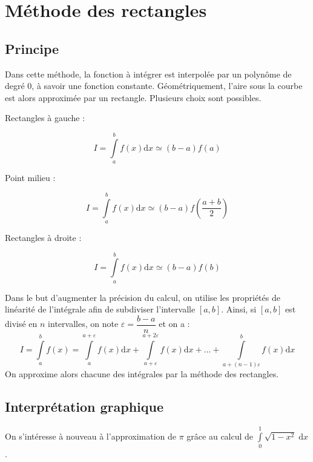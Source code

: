 \documentclass[10pt,fleqn]{article} %
\begin{document}
\section{Méthode des rectangles}
\subsection{Principe}
\begin{defi}
Dans cette méthode, la fonction à intégrer est interpolée par un polynôme de degré 0, à savoir une fonction constante. Géométriquement, l'aire sous la courbe est alors approximée par un rectangle. Plusieurs choix sont possibles.

\begin{minipage}[c]{.3\linewidth}
Rectangles à gauche :

$$
I = \int\limits_a^{b} f(x) \mathrm{d}x \simeq \left(b-a\right) f(a) 
$$
\end{minipage}\hfill
\begin{minipage}[c]{.3\linewidth}
Point milieu :

$$
I = \int\limits_a^{b} f(x) \mathrm{d}x \simeq \left(b-a\right) f\left(\dfrac{a+b}{2}\right) 
$$
\end{minipage}\hfill
\begin{minipage}[c]{.3\linewidth}
Rectangles à droite :

$$
I = \int\limits_a^{b} f(x) \mathrm{d}x \simeq \left(b-a\right) f(b) 
$$
\end{minipage}

\end{defi}

\begin{rem}
Dans le but d'augmenter la précision du calcul, on utilise les propriétés de linéarité de l'intégrale afin de subdiviser l'intervalle $[a,b]$. Ainsi, si $[a,b]$ est divisé en $n$ intervalles, on note $\varepsilon=\dfrac{b-a}{n}$ et on a :  
$$
I= \int\limits_a^{b} f(x) = \int\limits_{a}^{a+\varepsilon} f(x) \mathrm{d}x + \int\limits_{a+\varepsilon}^{a+2\varepsilon} f(x) \mathrm{d}x + ... + \int\limits_{a+(n-1)\varepsilon}^{b} f(x) \mathrm{d}x
$$
On approxime alors chacune des intégrales par la méthode des rectangles.
\end{rem}
\subsection{Interprétation graphique}

On s'intéresse à nouveau à l'approximation de $\pi$ grâce au calcul de $\int\limits_0^{1}\sqrt{1-x^2}\;\mathrm{d}x$ .
\end{document}
